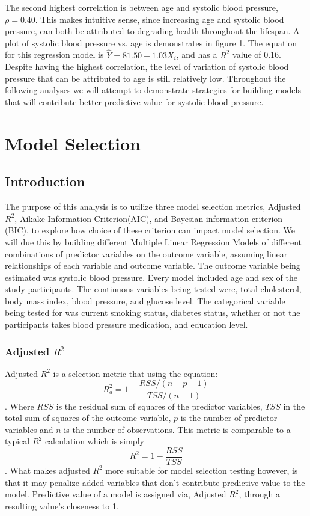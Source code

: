 \documentclass{article}\usepackage[]{graphicx}\usepackage[]{color}
\begin{document}
The second highest correlation is between age and systolic blood pressure, $\rho=0.40$.  This makes intuitive sense, since increasing age and systolic blood pressure, can both be attributed to degrading health throughout the lifespan.  A plot of systolic blood pressure vs. age is demonstrates in figure 1.  The equation for this regression model is $\hat{Y}=81.50+1.03X_i$, and has a $R^2$ value of 0.16.   Despite having the highest correlation, the level of variation of systolic blood pressure that can be attributed to age is still relatively low. Throughout the following analyses we will attempt to demonstrate strategies for building models that will contribute better predictive value for systolic blood pressure.

\section{Model Selection}

\subsection{Introduction}

  The purpose of this analysis is to utilize three model selection metrics, Adjusted $R^2$, Aikake Information Criterion(AIC), and Bayesian information criterion (BIC), to explore how choice of these criterion can impact model selection. We will due this by building different Multiple Linear Regression Models of different combinations of predictor variables on the outcome variable, assuming linear relationships of each variable and outcome variable.  The outcome variable being estimated was systolic blood pressure.  Every model included age and sex of the study participants. The continuous variables being tested were, total cholesterol, body mass index, blood pressure, and glucose level.  The categorical variable being tested for was current smoking status, diabetes status, whether or not the participants takes blood pressure medication, and education level.

\subsubsection*{Adjusted $R^2$}
  Adjusted $R^2$ is a selection metric that using the equation: $$R^2_a = 1-\frac{RSS/(n-p-1)}{TSS/(n-1)}$$.  Where $RSS$ is the residual sum of squares of the predictor variables, $TSS$ in the total sum of squares of the  outcome variable, $p$ is the number of predictor variables and $n$ is the number of observations.  This metric is comparable to a typical $R^2$ calculation which is simply $$R^2=1-\frac{RSS}{TSS}$$.  What makes adjusted $R^2$ more suitable for model selection testing however, is that it may penalize added variables that don't contribute predictive value to the model.  Predictive value of a model is assigned via, Adjusted $R^2$, through a resulting value's closeness to 1.
\end{document}
